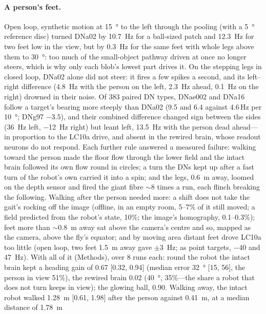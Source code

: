 \documentclass[10pt,a4paper]{article}
\begin{document}
\paragraph{A person's feet.} Open loop, synthetic motion at \SI{15}{\degree} to the left through the
pooling (with a \SI{5}{\degree} reference disc) turned DNa02 by \SI{+10.7}{Hz} for a ball-sized patch and
\SI{+12.3}{Hz} for two feet low in the view, but by \SI{+0.3}{Hz} for the same feet with whole legs above
them to \SI{+30}{\degree}: too much of the small-object pathway driven at once no longer steers, which is
why only each blob's lowest part drives it. On the stepping legs in closed loop, DNa02 alone did not
steer: it fires a few spikes a second, and its left--right difference (\SI{+4.8}{Hz} with the person on
the left, \SI{+2.3}{Hz} ahead, \SI{+0.1}{Hz} on the right) drowned in their noise. Of 383 paired DN types,
DNae002 and DNa16 follow a target's bearing more steeply than DNa02 (9.5 and 6.4 against 4.6\,Hz per
\SI{10}{\degree}; DNg97 $-3.5$), and their combined difference changed sign between the sides
(\SI{+36}{Hz} left, \SI{-12}{Hz} right) but leant left, \SI{+13.5}{Hz} with the person dead ahead---in
proportion to the LC10a drive, and absent in the rewired brain, whose readout neurons do not respond.
Each further rule answered a measured failure: walking toward the person made the floor flow through the
lower field and the intact brain followed its own flow round in circles; a turn the DNs kept up after a
fast turn of the robot's own carried it into a spin; and the legs, \SI{0.6}{m} away, loomed on the depth
sensor and fired the giant fibre $\sim$8 times a run, each flinch breaking the following. Walking after
the person needed more: a shift does not take the gait's rocking off the image (offline, in an empty room,
5--7\% of it still moved; a field predicted from the robot's state, 10\%; the image's homography, 0.1--0.3\%);
feet more than $\sim$\SI{0.8}{m} away sat above the camera's centre and so, mapped as the camera, above
the fly's equator; and by moving area distant feet drove LC10a too little (open loop, two feet
\SI{1.5}{m} away gave $\pm$\SI{3}{Hz}; as point targets, $-40$ and \SI{+47}{Hz}). With all of it (Methods),
over 8 runs each: round the robot the intact brain kept a heading gain of 0.67 [0.32, 0.94] (median error
\SI{32}{\degree} [15, 56], the person in view 51\%), the rewired brain 0.02 (\SI{40}{\degree}, 35\%---the
share a robot that does not turn keeps in view); the glowing ball, 0.90. Walking away, the intact robot
walked \SI{1.28}{m} [0.61, 1.98] after the person against \SI{0.41}{m}, at a median distance of \SI{1.78}{m}
\end{document}

